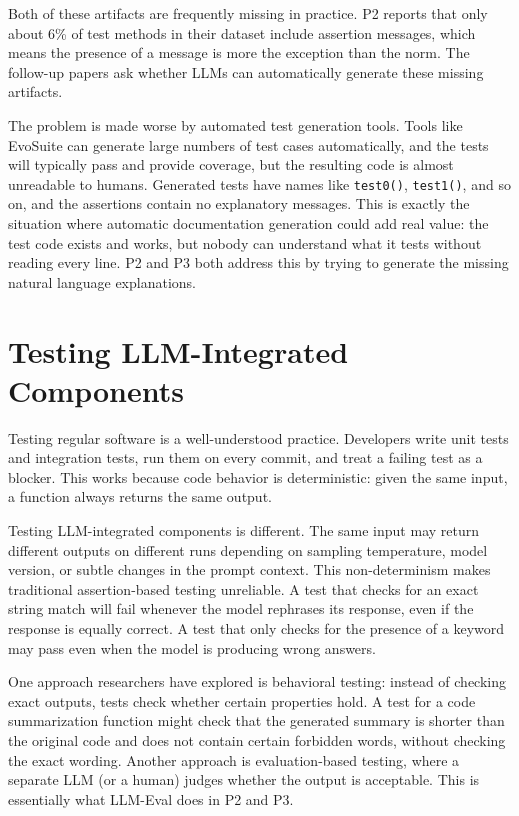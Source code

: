 \documentclass[
    pdftex,
    final,
    11pt,
    a4paper,
    parskip=false,
    oneside,
    footheight=0mm,
    footinclude=false,
    toc=bibliography
]{scrbook}
\begin{document}
Both of these artifacts are frequently missing in practice. P2 reports that only about 6\% of test methods in their dataset include assertion messages, which means the presence of a message is more the exception than the norm. The follow-up papers ask whether LLMs can automatically generate these missing artifacts.

The problem is made worse by automated test generation tools. Tools like EvoSuite can generate large numbers of test cases automatically, and the tests will typically pass and provide coverage, but the resulting code is almost unreadable to humans. Generated tests have names like \texttt{test0()}, \texttt{test1()}, and so on, and the assertions contain no explanatory messages. This is exactly the situation where automatic documentation generation could add real value: the test code exists and works, but nobody can understand what it tests without reading every line. P2 and P3 both address this by trying to generate the missing natural language explanations.

\section{Testing LLM-Integrated Components}

Testing regular software is a well-understood practice. Developers write unit tests and integration tests, run them on every commit, and treat a failing test as a blocker. This works because code behavior is deterministic: given the same input, a function always returns the same output.

Testing LLM-integrated components is different. The same input may return different outputs on different runs depending on sampling temperature, model version, or subtle changes in the prompt context. This non-determinism makes traditional assertion-based testing unreliable. A test that checks for an exact string match will fail whenever the model rephrases its response, even if the response is equally correct. A test that only checks for the presence of a keyword may pass even when the model is producing wrong answers.

One approach researchers have explored is behavioral testing: instead of checking exact outputs, tests check whether certain properties hold. A test for a code summarization function might check that the generated summary is shorter than the original code and does not contain certain forbidden words, without checking the exact wording. Another approach is evaluation-based testing, where a separate LLM (or a human) judges whether the output is acceptable. This is essentially what LLM-Eval does in P2 and P3.
\end{document}
